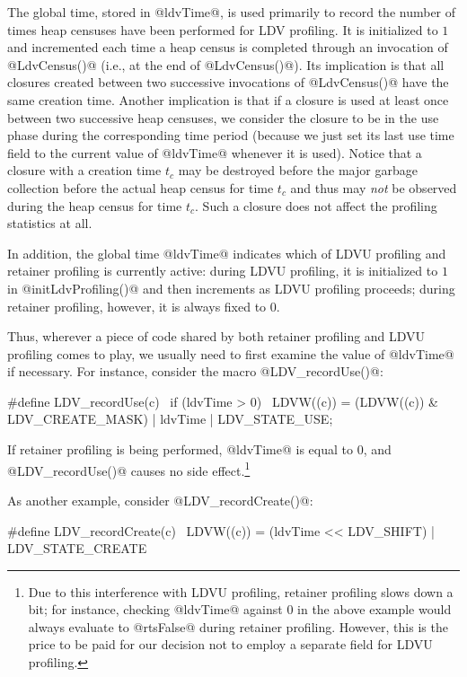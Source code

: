 \documentclass{article}
\begin{document}
The global time, stored in @ldvTime@, is used primarily to record the number
of times heap censuses have been performed for LDV profiling. 
It is initialized to $1$ and incremented each time a heap census is completed 
through an invocation of @LdvCensus()@ (i.e., at the end of @LdvCensus()@).
Its implication is that 
all closures created between two successive invocations of @LdvCensus()@
have the same creation time.
Another implication is that 
if a closure is used at least once between two successive heap 
censuses, we consider the closure to be in the use phase 
during the corresponding time period 
(because we just set its last use time field to the current value
of @ldvTime@ whenever it is used).
Notice that a closure with a creation time $t_c$ may be destroyed before
the major garbage collection before the actual heap census for time $t_c$ and thus 
may \emph{not} be observed during the heap census for time $t_c$.
Such a closure does not affect the profiling statistics at all.

In addition, the global time @ldvTime@ indicates
which of LDVU profiling and retainer profiling is currently active:
during LDVU profiling, it is initialized to $1$ in @initLdvProfiling()@
and then increments as LDVU profiling proceeds;
during retainer profiling, however, it is always fixed to $0$.

Thus, wherever a piece of code shared by both retainer profiling and
LDVU profiling comes to play, we usually need to first examine the value of @ldvTime@
if necessary. For instance, consider the macro @LDV_recordUse()@:

\begin{code}
#define LDV_recordUse(c)                              \
  if (ldvTime > 0)                                    \
    LDVW((c)) = (LDVW((c)) & LDV_CREATE_MASK) | ldvTime | LDV_STATE_USE; 
\end{code}

If retainer profiling is being performed, @ldvTime@ is equal to $0$, and
@LDV_recordUse()@ causes no side effect.\footnote{Due to this interference
with LDVU profiling, retainer profiling slows down a bit; for instance, 
checking @ldvTime@ against $0$ in the above example would always evaluate to
@rtsFalse@ during retainer profiling.
However, this is the price to be paid for our decision not to employ a 
separate field for LDVU profiling.}

As another example, consider @LDV_recordCreate()@:

\begin{code}
#define LDV_recordCreate(c)   \
  LDVW((c)) = (ldvTime << LDV_SHIFT) | LDV_STATE_CREATE
\end{code}
\end{document}
